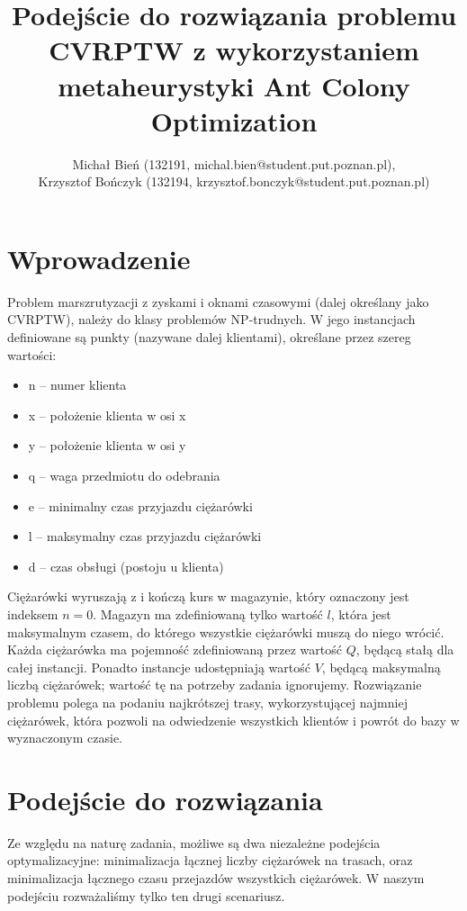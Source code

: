 \documentclass[a4paper]{article}
\date{}
\title{Podejście do rozwiązania problemu CVRPTW z wykorzystaniem metaheurystyki Ant Colony Optimization}
\author{Michał Bień (132191, michal.bien@student.put.poznan.pl),\\ Krzysztof Bończyk (132194, krzysztof.bonczyk@student.put.poznan.pl)}
\begin{document}
\maketitle

\section{Wprowadzenie}
Problem marszrutyzacji z zyskami i oknami czasowymi (dalej określany jako CVRPTW), należy do klasy problemów NP-trudnych. W jego instancjach\cite{cvrptw} definiowane są punkty (nazywane dalej klientami), określane przez szereg wartości:\\
\begin{itemize}
\item n -- numer klienta
\item x -- położenie klienta w osi x
\item y -- położenie klienta w osi y
\item q -- waga przedmiotu do odebrania
\item e -- minimalny czas przyjazdu ciężarówki
\item l -- maksymalny czas przyjazdu ciężarówki
\item d -- czas obsługi (postoju u klienta)
\end{itemize}
Ciężarówki wyruszają z i kończą kurs w magazynie, który oznaczony jest indeksem $n = 0$. Magazyn ma zdefiniowaną tylko wartość $l$, która jest maksymalnym czasem, do którego wszystkie ciężarówki muszą do niego wrócić. Każda ciężarówka ma pojemność zdefiniowaną przez wartość $Q$, będącą stałą dla całej instancji. Ponadto instancje udostępniają wartość $V$, będącą maksymalną liczbą ciężarówek; wartość tę na potrzeby zadania\cite{drozd} ignorujemy. Rozwiązanie problemu polega na podaniu najkrótszej trasy, wykorzystującej najmniej ciężarówek, która pozwoli na odwiedzenie wszystkich klientów i powrót do bazy w wyznaczonym czasie.

\section{Podejście do rozwiązania}
Ze względu na naturę zadania, możliwe są dwa niezależne podejścia optymalizacyjne: minimalizacja łącznej liczby ciężarówek na trasach, oraz minimalizacja łącznego czasu przejazdów wszystkich ciężarówek. W naszym podejściu rozważaliśmy tylko ten drugi scenariusz.
\end{document}
